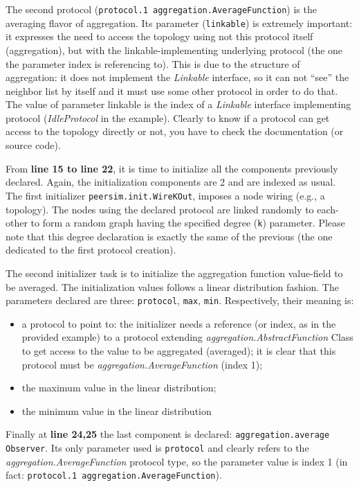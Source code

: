 \documentclass[a4paper,11pt]{article}
\begin{document}
The second protocol (\texttt{protocol.1 aggregation.AverageFunction})
is the averaging flavor of aggregation. Its parameter (\texttt{linkable})
is extremely important: it expresses the need to access the topology
using not this protocol itself (aggregation), but with the
linkable-implementing underlying protocol (the one the parameter index is
referencing to). This is due to the structure
of aggregation: it does not implement the \emph{Linkable} interface,
so it can not ``see'' the neighbor list by itself and it must use some other
protocol in order to do that. The value of parameter linkable is the index
of a \emph{Linkable} interface implementing protocol (\emph{IdleProtocol}
in the example). Clearly to know if a protocol can get access to the
topology directly or not, you have to check the documentation (or source
code).

From \textbf{line 15 to line 22}, it is time to initialize all the
components previously declared. Again, the initialization components
are 2 and are indexed as usual. The first initializer 
\texttt{peersim.init.WireKOut},
imposes a node wiring (e.g., a topology). The nodes using the declared protocol are linked
randomly to each-other to form a random graph having the specified
degree (\texttt{k}) parameter. Please note that this degree declaration is exactly
the same of the previous (the one dedicated to the first protocol
creation). 

The second initializer task is to initialize the aggregation function
value-field to be averaged. The initialization values follows a linear
distribution fashion. The parameters declared are three: \texttt{protocol},
\texttt{max}, \texttt{min}. Respectively, their meaning is:

\begin{itemize}
\item a protocol to point to: the initializer needs a reference (or
  index, as in the provided example)
to a protocol extending \emph{aggregation.AbstractFunction} Class
to get access to the value to be aggregated (averaged); it is clear
that this protocol must be \emph{aggregation.AverageFunction} (index
1);
\item the maximum value in the linear distribution; 
\item the minimum value in the linear distribution 
\end{itemize}

Finally at \textbf{line 24,25} the last component is declared: 
\texttt{aggregation.average Observer}.
Its only parameter used is \texttt{protocol} and clearly refers to the
\emph{aggregation.AverageFunction} protocol type, so the parameter
value is index 1 (in fact: \texttt{protocol.1 aggregation.AverageFunction}). 
\end{document}
